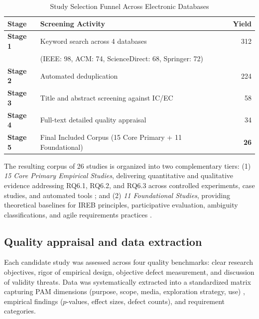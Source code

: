 \begin{table}[htbp]
\centering
\caption{Study Selection Funnel Across Electronic Databases}
\label{tab:selection_funnel}
\begin{tabularx}{\columnwidth}{l X r}
\toprule
\textbf{Stage} & \textbf{Screening Activity} & \textbf{Yield} \\
\midrule
\textbf{Stage 1} & Keyword search across 4 databases & 312 \\
                 & \quad (IEEE: 98, ACM: 74, ScienceDirect: 68, Springer: 72) & \\
\textbf{Stage 2} & Automated deduplication & 224 \\
\textbf{Stage 3} & Title and abstract screening against IC/EC & 58 \\
\textbf{Stage 4} & Full-text detailed quality appraisal & 34 \\
\textbf{Stage 5} & Final Included Corpus (15 Core Primary + 11 Foundational) & \textbf{26} \\
\bottomrule
\end{tabularx}
\end{table}

The resulting corpus of 26 studies is organized into two complementary tiers:
(1) \textit{15 Core Primary Empirical Studies}, delivering quantitative and qualitative evidence addressing RQ6.1, RQ6.2, and RQ6.3 across controlled experiments, case studies, and automated tools \cite{bjarnason2023empirically, rueda2020requirements, uv2023empirical, rej2022evolve, antonelli2022iterative, bano2023videos, gupta2022strategic, acm2022proposal, diaz2021gender, cascon2025ambiguity, hoffmann2011automotive, lending2022rubric, kolthoff2024interlinking, kolthoff2024selfelicitation, wei2023boosting}; and
(2) \textit{11 Foundational Studies}, providing theoretical baselines for IREB principles, participative evaluation, ambiguity classifications, and agile requirements practices \cite{pohl2016requirements, hickey1998prototyping, abad2018loud, jserd2019protopersona, davis2018maturity, ferrari2016ambiguity, spoletini2018interview, brill2010videos, lim2008anatomy, inayat2015systematic, berry2003contract}.

\subsection{Quality appraisal and data extraction}
Each candidate study was assessed across four quality benchmarks: clear research objectives, rigor of empirical design, objective defect measurement, and discussion of validity threats. Data was systematically extracted into a standardized matrix capturing PAM dimensions (purpose, scope, media, exploration strategy, use) \cite{bjarnason2023empirically}, empirical findings ($p$-values, effect sizes, defect counts), and requirement categories.
